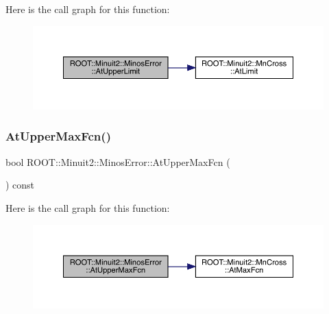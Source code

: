 Here is the call graph for this function\+:
\nopagebreak
\begin{figure}[H]
\begin{center}
\leavevmode
\includegraphics[width=350pt]{d2/dd1/classROOT_1_1Minuit2_1_1MinosError_a6c8a60e5b855f9d7164f441ea69c75eb_cgraph}
\end{center}
\end{figure}
\mbox{\label{classROOT_1_1Minuit2_1_1MinosError_a940c974f6ac87d22c4d340ef2fc88e8c}} 
\subsubsection{\texorpdfstring{AtUpperMaxFcn()}{AtUpperMaxFcn()}\hspace{0.1cm}{\footnotesize\ttfamily [1/2]}}
{\footnotesize\ttfamily bool R\+O\+O\+T\+::\+Minuit2\+::\+Minos\+Error\+::\+At\+Upper\+Max\+Fcn (\begin{DoxyParamCaption}{ }\end{DoxyParamCaption}) const\hspace{0.3cm}{\ttfamily [inline]}}

Here is the call graph for this function\+:
\nopagebreak
\begin{figure}[H]
\begin{center}
\leavevmode
\includegraphics[width=350pt]{d2/dd1/classROOT_1_1Minuit2_1_1MinosError_a940c974f6ac87d22c4d340ef2fc88e8c_cgraph}
\end{center}
\end{figure}
\mbox{\label{classROOT_1_1Minuit2_1_1MinosError_a940c974f6ac87d22c4d340ef2fc88e8c}} 
